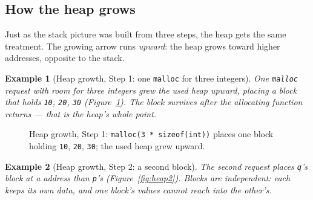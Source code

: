 \documentclass[11pt]{article}
\newtheorem{example}{Example}[section]
\begin{document}
\subsection{How the heap grows}

Just as the stack picture was built from three steps, the heap gets the same
treatment. The growing arrow runs \emph{upward}: the heap grows toward higher
addresses, opposite to the stack.

\begin{example}[Heap growth, Step 1: one \texttt{malloc} for three integers]
One \texttt{malloc} request with room for three integers grew the used heap
upward, placing a block that holds \texttt{10}, \texttt{20}, \texttt{30}
(Figure~\ref{fig:heap1}). The block survives after the allocating function
returns --- that is the heap's whole point.
\end{example}

\begin{figure}[h]
  \centering
  \caption{Heap growth, Step 1: \texttt{malloc(3 * sizeof(int))} places one
  block holding \texttt{10}, \texttt{20}, \texttt{30}; the used heap grew
  upward.}
  \label{fig:heap1}
\end{figure}

\begin{example}[Heap growth, Step 2: a second block]
The second request places \texttt{q}'s block at a  address than
\texttt{p}'s (Figure~\ref{fig:heap2}). Blocks are independent: each keeps its
own data, and one block's values cannot reach into the other's.
\end{example}
\end{document}
